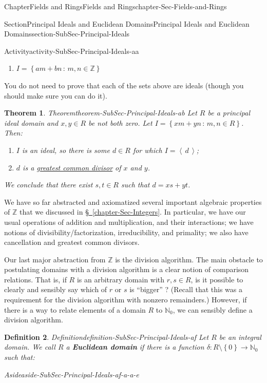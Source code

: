 \documentclass[oneside,10pt,]{book}
\newcommand{\xreffont}{\relax}
\newcommand{\terminology}[1]{\textbf{#1}}
\numberwithin{equation}{section}
\newcommand{\ideal}[1]{\left\langle\, #1 \,\right\rangle}
\newcommand{\set}[1]{\left\{ {#1} \right\}}
\newcommand{\setof}[2]{{\left\{#1\,\colon\,#2\right\}}}
\def\Z{{\mathbb Z}}
\def\N{{\mathbb N}}
\newtheorem{theorem}{Theorem}[section]
\newtheorem{definition}[theorem]{Definition}
\begin{document}
\begin{chapterptx}{Chapter}{Fields and Rings}{}{Fields and Rings}{}{}{chapter-Sec-Fields-and-Rings}
\begin{sectionptx}{Section}{Principal Ideals and Euclidean Domains}{}{Principal Ideals and Euclidean Domains}{}{}{section-SubSec-Principal-Ideals}
\begin{activity}{Activity}{}{activity-SubSec-Principal-Ideals-aa}
\begin{enumerate}
\item{}\(\displaystyle I = \setof{am+bn}{m,n\in\Z}\)%
\end{enumerate}
%
\par
You do not need to prove that each of the sets above are ideals (though you should make sure you can do it).%
\end{activity}%
\begin{theorem}{Theorem}{}{}{theorem-SubSec-Principal-Ideals-ab}%
Let \(R\) be a principal ideal domain and \(x,y\in R\) be not both zero. Let \(I = \setof{xm+yn}{m,n\in R}\). Then:%
\begin{enumerate}
\item{}\(I\) is an ideal, so there is some \(d\in R\) for which \(I = \ideal{d}\);%
\item{}\(d\) is a \hyperref[definition-def-gcd-domain]{greatest common divisor} of \(x\) and \(y\).%
\end{enumerate}
%
\par
We conclude that there exist \(s,t\in R\) such that \(d = xs + yt\).%
\end{theorem}
We have so far abstracted and axiomatized several important algebraic properties of \(\Z\) that we discussed in \hyperref[chapter-Sec-Integers]{§~{\xreffont\ref{chapter-Sec-Integers}}}. In particular, we have our usual operations of addition and multiplication, and their interactions; we have notions of divisibility\slash{}factorization, irreducibility, and primality; we also have cancellation and greatest common divisors.%
\par
Our last major abstraction from \(\Z\) is the division algorithm. The main obstacle to postulating domains with a division algorithm is a clear notion of comparison relations. That is, if \(R\) is an arbitrary domain with \(r,s\in R\), is it possible to clearly and sensibly say which of \(r\) or \(s\) is ``bigger'' ? (Recall that this was a requirement for the division algorithm with nonzero remainders.) However, if there is a way to relate elements of a domain \(R\) to \(\N_0\), we can sensibly define a division algorithm.%
\begin{definition}{Definition}{}{definition-SubSec-Principal-Ideals-af}%
Let \(R\) be an integral domain. We call \(R\) a \terminology{Euclidean domain} if there is a function \(\delta : R\setminus \set{0} \to \N_0\) such that: \begin{aside}{Aside}{}{aside-SubSec-Principal-Ideals-af-a-a-e}%
\end{aside}
%
\begin{enumerate}

\end{enumerate}
\end{definition}
\end{sectionptx}
\end{chapterptx}
\end{document}
